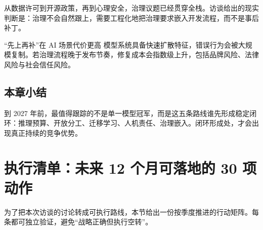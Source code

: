 \documentclass[a4paper]{article}
\begin{document}
从数据许可到开源政策，再到心理安全，治理议题已经贯穿全栈。访谈给出的现实判断是：治理不会自然跟上，需要工程化地把治理要求嵌入开发流程，而不是事后补丁。

\begin{warningbox}{“先上再补”在 AI 场景代价更高}
模型系统具备快速扩散特征，错误行为会被大规模复制。若治理流程晚于发布节奏，修复成本会指数级上升，包括品牌风险、法律风险与社会信任风险。
\end{warningbox}

\subsection{本章小结}

到 2027 年前，最值得跟踪的不是单一模型冠军，而是这五条路线谁先形成稳定闭环：推理预算、开放分工、迁移学习、人机责任、治理嵌入。闭环形成处，才会出现真正持续的竞争优势。

\section{执行清单：未来 12 个月可落地的 30 项动作}

为了把本次访谈的讨论转成可执行路线，本节给出一份按季度推进的行动矩阵。每条都可独立验证，避免“战略正确但执行空转”。
\end{document}
